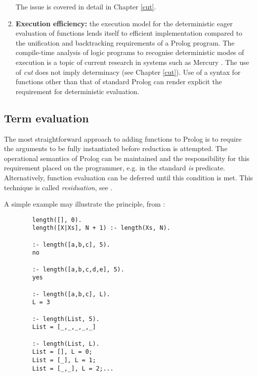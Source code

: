\begin{enumerate}
{  The issue is covered in detail in Chapter \ref{cut}.}
\item{\textbf{Execution efficiency:} the execution model for
  the deterministic eager evaluation of functions lends itself to efficient implementation
  compared to the unification and backtracking requirements of a Prolog program.  The
  compile-time analysis of logic programs to recognise deterministic modes of execution
  is a topic of current research in systems such as Mercury \cite{HCSR95}.  The use of
  \textit{cut} does not imply determinacy (see Chapter \ref{cut}).  Use of a syntax 
  for functions other than that of standard Prolog can render explicit the requirement for
  deterministic evaluation.}
\end{enumerate}

\subsection{Term evaluation}

The most straightforward approach to adding functions to Prolog is to require the arguments
to be fully instantiated before reduction is attempted.  The operational semantics of Prolog
can be maintained and the responsibility for this requirement placed on the programmer, e.g. in
the standard \textit{is} predicate.  Alternatively,
function evaluation can be deferred until this condition is met.
This technique is called \textit{residuation}, see \cite{AKLN87}.

A simple example may illustrate the principle, from \cite{MBB+93}:

\noindent
\begin{verbatim}
		length([], 0).
		length([X|Xs], N + 1) :- length(Xs, N).

		:- length([a,b,c], 5).
		no

		:- length([a,b,c,d,e], 5).
		yes

		:- length([a,b,c], L).
		L = 3

		:- length(List, 5).
		List = [_,_,_,_,_]

		:- length(List, L).
		List = [], L = 0;
		List = [_], L = 1;
		List = [_,_], L = 2;...
\end{verbatim}

